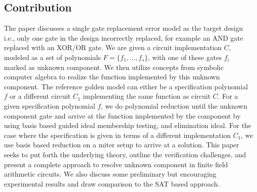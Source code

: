 \subsection{Contribution}
The paper discusses a single gate replacement error model as the target design i.e., only one gate in the design incorrectly replaced, for example an AND gate replaced with an XOR/OR gate. We are given a circuit implementation $C$, modeled as a set of polynomials $F=\{f_1,\dots,f_s\}$, with one of these gates $f_i$ marked as unknown component. We then utilize concepts from symbolic computer algebra to realize the function implemented by this unknown component. The reference golden model can either be a specification polynomial $f$ or a different circuit $C_1$ implementing the same function as circuit $C$. For a given specification polynomial $f$, we do polynomial reduction until the unknown component gate and arrive at the function implemented by the component by using \Grobner basis based guided ideal membership testing, and elimination ideal. For the case where the specification is given in terms of a different implementation $C_1$, we use \Grobner basis based reduction on a miter setup to arrive at a solution. %
This paper seeks to put forth the underlying theory, outline the verification challenges, and present a complete approach to resolve unknown component in finite field arithmetic circuits. We also discuss some preliminary but encouraging experimental results and draw comparison to the SAT based approach.  


